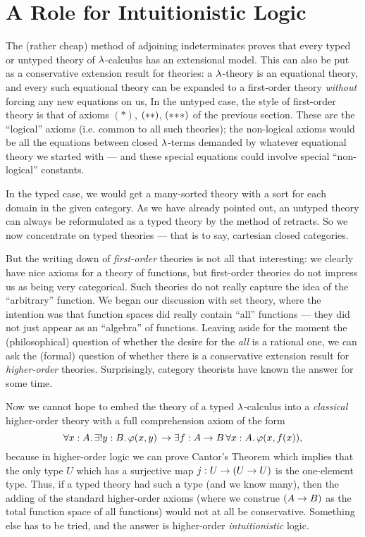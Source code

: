\section{A Role for Intuitionistic Logic}

The (rather cheap) method of adjoining indeterminates proves that every typed or untyped
theory of $\l$-calculus has an extensional model. This can also be put as a conservative
extension result for theories: a $\l$-theory is an equational theory, and every such
equational theory can be expanded to a first-order theory {\it without} forcing any new
equations on us,  In the untyped case, the style of first-order theory is that of axioms
$(*)$, $\ss$, $\sss$ of the previous section. These are the ``logical'' axioms (i.e.
common to all such theories); the non-logical axioms would be all the equations between
closed $\l$-terms demanded by whatever equational theory we started with --- and these
special equations could involve special ``non-logical'' constants.

In the typed case, we would get a many-sorted theory with a sort for each domain in the
given category. As we have already pointed out, an untyped theory can always be
reformulated as a typed theory by the method of retracts. So we now concentrate on typed
theories --- that is to say, cartesian closed categories.

But the writing down of {\it first-order} theories is not all that interesting: we clearly
have nice axioms for a theory of functions, but first-order theories do not impress us as
being very categorical. Such theories do not really capture the idea of the ``arbitrary''
function. We began our discussion with set theory, where the intention was that function
spaces did really contain ``all'' functions --- they did not just appear as an ``algebra''
of functions. Leaving aside for the moment the (philosophical) question of whether the
desire for the {\it all} is a rational one, we can ask the (formal) question of whether
there is a conservative extension result for {\it higher-order} theories. Surprisingly,
category theorists have known the answer for some time. 

Now we cannot hope to embed the
theory of a typed $\l$-calculus into a {\it classical} higher-order theory with a full
comprehension axiom of the form
$$
\forall x:A .\, \exists !y: B .\,  \ffam(x,y)  \, \to  \exists f: \AB \, \forall x: A .\, \ffam(x,f(x)),
$$
because in higher-order logic we can prove Cantor's Theorem which implies that the only
type $U$ which has a surjective map $j : U \to \UU$ is the one-element type. Thus, if a
typed theory had such a type (and we know many), then the adding of the standard
higher-order axioms (where we construe $(\AB)$ as the total function space of all
functions) would not at all be conservative. Something else has to be tried, and the
answer is higher-order {\it intuitionistic} logic.

